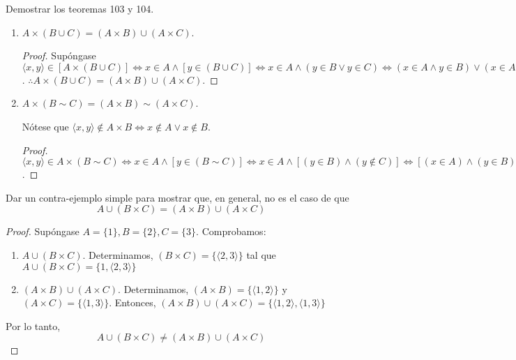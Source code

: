 \begin{problema}
	Demostrar los teoremas 103  y 104.
	\begin{enumerate}
		\item[103.] $A\times (B\cup C)=(A\times B)\cup (A\times C)$.
		\begin{proof}
			Supóngase $\langle x, y\rangle \in \left[A\times (B\cup C)\right]\iff x\in A\wedge [y\in (B\cup C)]\iff x\in A \wedge (y\in B\vee y\in C)\iff (x\in A\wedge y\in B)\vee(x\in A\wedge y\in C)\iff \langle x, y \rangle \in (A\times B)\cup (A\times C)$. $\therefore A\times (B\cup C)=(A\times B)\cup (A\times C)$.  
		\end{proof}
		\item[104.] $A\times (B \sim C)= (A\times B)\sim (A\times C)$.
			\begin{cajita}
			Nótese que $\langle x,y \rangle \not\in A\times B \iff x\not\in A \vee x\not\in B  $.
		\end{cajita}
	\begin{proof}
			$\langle x, y\rangle \in A\times (B\sim C)\iff x\in A \wedge \left[y\in (B\sim C)\right]\iff x\in A \wedge [(y\in B)\wedge (y\not\in C)]\iff [(x\in A) \wedge (y\in B)] \wedge  ( y\not\in C)\iff \langle x, y\rangle \in (A\times B)\sim (A\times C) $. 
	\end{proof}
	\end{enumerate}
\end{problema}


\begin{problema}
	Dar un contra-ejemplo simple para mostrar que, en general, no es el caso de que
	$$
	A \cup(B \times C)=(A \times B) \cup(A \times C)
	$$
\end{problema}
\begin{proof}
	Supóngase $A=\{1\}, B=\{2\}, C=\{3\}$. Comprobamos:
	\begin{enumerate}
		\item $A \cup(B \times C)$.  Determinamos, $(B\times C)=\{\langle 2,3\rangle\}$ tal que $A \cup(B \times C)=\{1,\langle 2,3\rangle \}$
		\item $(A \times B) \cup(A \times C)$. Determinamos, $(A \times B) = \{\langle 1, 2\rangle \}$ y $(A\times C)=\{\langle 1, 3\rangle\}$. Entonces, $(A \times B) \cup(A \times C)= \{\langle 1, 2\rangle, \langle 1, 3\rangle \}$
	\end{enumerate}
	Por lo tanto, $$
	A \cup(B \times C)\neq (A \times B) \cup(A \times C)
	$$
\end{proof}

